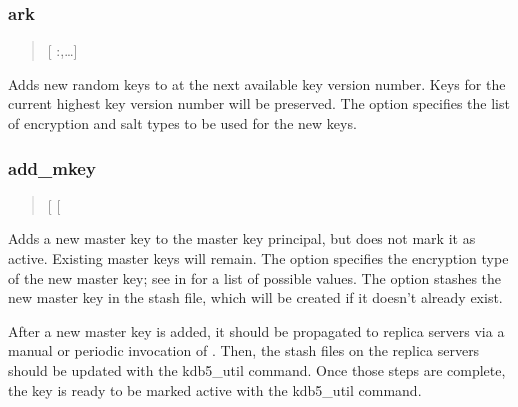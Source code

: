 \documentclass[letterpaper,10pt,english]{sphinxmanual}
\begin{document}
\subsubsection{ark}
\label{\detokenize{admin/admin_commands/kdb5_util:kdb5-util-load-end}}\label{\detokenize{admin/admin_commands/kdb5_util:ark}}\begin{quote}

 {[} :,…{]} 
\end{quote}

Adds new random keys to  at the next available key version
number.  Keys for the current highest key version number will be
preserved.  The  option specifies the list of encryption and
salt types to be used for the new keys.


\subsubsection{add\_mkey}
\label{\detokenize{admin/admin_commands/kdb5_util:add-mkey}}\begin{quote}

 {[} \sphinxstyleemphasis{etype}{]} {[}\sphinxstylestrong{-s}{]}
\end{quote}

Adds a new master key to the master key principal, but does not mark
it as active.  Existing master keys will remain.  The  option
specifies the encryption type of the new master key; see
{\hyperref[\detokenize{admin/conf_files/kdc_conf:encryption-types}]{}} in {\hyperref[\detokenize{admin/conf_files/kdc_conf:kdc-conf-5}]{}} for a list of possible
values.  The  option stashes the new master key in the stash
file, which will be created if it doesn’t already exist.

After a new master key is added, it should be propagated to replica
servers via a manual or periodic invocation of {\hyperref[\detokenize{admin/admin_commands/kprop:kprop-8}]{}}.  Then,
the stash files on the replica servers should be updated with the
kdb5\_util  command.  Once those steps are complete, the key
is ready to be marked active with the kdb5\_util  command.
\end{document}
